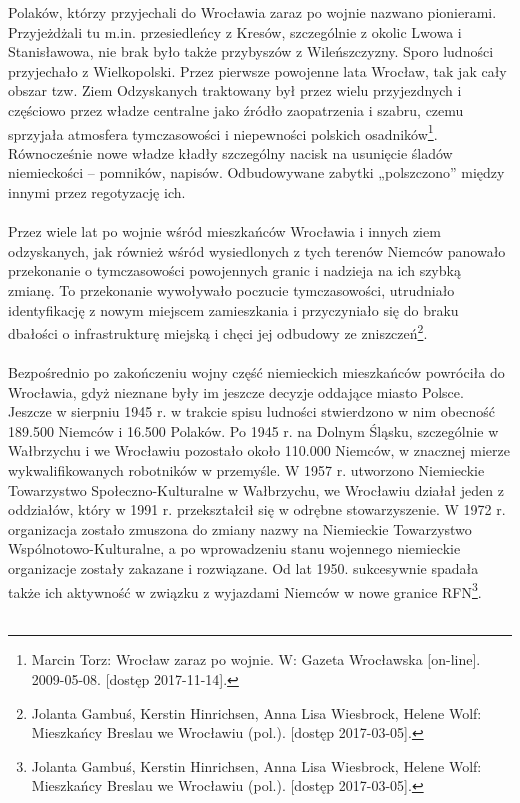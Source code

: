 \documentclass[12pt]{article}
\begin{document}
Polaków, którzy przyjechali do Wrocławia zaraz po wojnie nazwano pionierami. Przyjeżdżali tu m.in. przesiedleńcy z Kresów, szczególnie z okolic Lwowa i Stanisławowa, nie brak było także przybyszów z Wileńszczyzny. Sporo ludności przyjechało z Wielkopolski. Przez pierwsze powojenne lata Wrocław, tak jak cały obszar tzw. Ziem Odzyskanych traktowany był przez wielu przyjezdnych i częściowo przez władze centralne jako źródło zaopatrzenia i szabru, czemu sprzyjała atmosfera tymczasowości i niepewności polskich osadników\footnote{Marcin Torz: Wrocław zaraz po wojnie. W: Gazeta Wrocławska [on-line]. 2009-05-08. [dostęp 2017-11-14].}. Równocześnie nowe władze kładły szczególny nacisk na usunięcie śladów niemieckości – pomników, napisów. Odbudowywane zabytki „polszczono” między innymi przez regotyzację ich.\\\\
Przez wiele lat po wojnie wśród mieszkańców Wrocławia i innych ziem odzyskanych, jak również wśród wysiedlonych z tych terenów Niemców panowało przekonanie o tymczasowości powojennych granic i nadzieja na ich szybką zmianę. To przekonanie wywoływało poczucie tymczasowości, utrudniało identyfikację z nowym miejscem zamieszkania i przyczyniało się do braku dbałości o infrastrukturę miejską i chęci jej odbudowy ze zniszczeń\footnote{Jolanta Gambuś, Kerstin Hinrichsen, Anna Lisa Wiesbrock, Helene Wolf: Mieszkańcy Breslau we Wrocławiu (pol.). [dostęp 2017-03-05].}.\\\\
Bezpośrednio po zakończeniu wojny część niemieckich mieszkańców powróciła do Wrocławia, gdyż nieznane były im jeszcze decyzje oddające miasto Polsce. Jeszcze w sierpniu 1945 r. w trakcie spisu ludności stwierdzono w nim obecność 189.500 Niemców i 16.500 Polaków. Po 1945 r. na Dolnym Śląsku, szczególnie w Wałbrzychu i we Wrocławiu pozostało około 110.000 Niemców, w znacznej mierze wykwalifikowanych robotników w przemyśle. W 1957 r. utworzono Niemieckie Towarzystwo Społeczno-Kulturalne w Wałbrzychu, we Wrocławiu działał jeden z oddziałów, który w 1991 r. przekształcił się w odrębne stowarzyszenie. W 1972 r. organizacja zostało zmuszona do zmiany nazwy na Niemieckie Towarzystwo Wspólnotowo-Kulturalne, a po wprowadzeniu stanu wojennego niemieckie organizacje zostały zakazane i rozwiązane. Od lat 1950. sukcesywnie spadała także ich aktywność w związku z wyjazdami Niemców w nowe granice RFN\footnote{Jolanta Gambuś, Kerstin Hinrichsen, Anna Lisa Wiesbrock, Helene Wolf: Mieszkańcy Breslau we Wrocławiu (pol.). [dostęp 2017-03-05].}.\\\\
\end{document}
